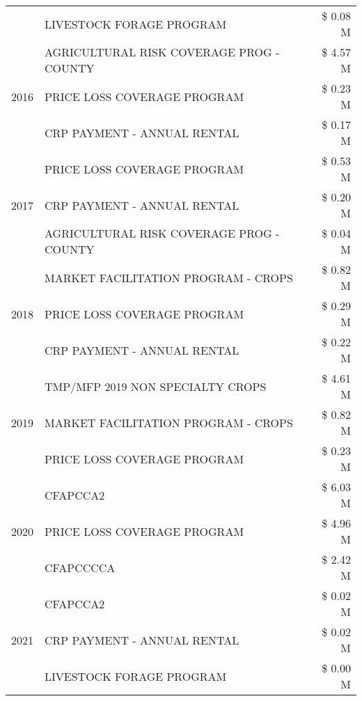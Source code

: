 \begin{tabular}{llr}
 & LIVESTOCK FORAGE PROGRAM & \$ 0.08 M \\
\cline{1-3}
\multirow[t]{3}{*}{2016} & AGRICULTURAL RISK COVERAGE PROG - COUNTY & \$ 4.57 M \\
 & PRICE LOSS COVERAGE PROGRAM & \$ 0.23 M \\
 & CRP PAYMENT - ANNUAL RENTAL & \$ 0.17 M \\
\cline{1-3}
\multirow[t]{3}{*}{2017} & PRICE LOSS COVERAGE PROGRAM & \$ 0.53 M \\
 & CRP PAYMENT - ANNUAL RENTAL & \$ 0.20 M \\
 & AGRICULTURAL RISK COVERAGE PROG - COUNTY & \$ 0.04 M \\
\cline{1-3}
\multirow[t]{3}{*}{2018} & MARKET FACILITATION PROGRAM - CROPS & \$ 0.82 M \\
 & PRICE LOSS COVERAGE PROGRAM & \$ 0.29 M \\
 & CRP PAYMENT - ANNUAL RENTAL & \$ 0.22 M \\
\cline{1-3}
\multirow[t]{3}{*}{2019} & TMP/MFP 2019 NON SPECIALTY CROPS & \$ 4.61 M \\
 & MARKET FACILITATION PROGRAM - CROPS & \$ 0.82 M \\
 & PRICE LOSS COVERAGE PROGRAM & \$ 0.23 M \\
\cline{1-3}
\multirow[t]{3}{*}{2020} & CFAPCCA2 & \$ 6.03 M \\
 & PRICE LOSS COVERAGE PROGRAM & \$ 4.96 M \\
 & CFAPCCCCA & \$ 2.42 M \\
\cline{1-3}
\multirow[t]{3}{*}{2021} & CFAPCCA2 & \$ 0.02 M \\
 & CRP PAYMENT - ANNUAL RENTAL & \$ 0.02 M \\
 & LIVESTOCK FORAGE PROGRAM & \$ 0.00 M \\
\cline{1-3}
\bottomrule
\end{tabular}
